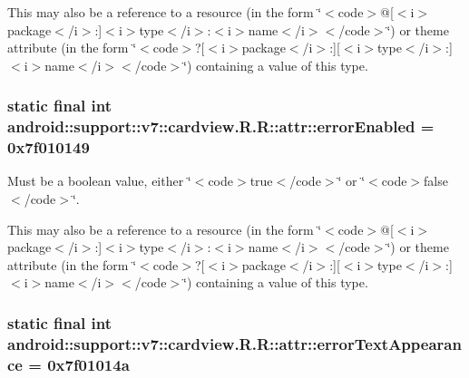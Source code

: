 This may also be a reference to a resource (in the form \char`\"{}$<$code$>$@\mbox{[}$<$i$>$package$<$/i$>$:\mbox{]}$<$i$>$type$<$/i$>$:$<$i$>$name$<$/i$>$$<$/code$>$\char`\"{}) or theme attribute (in the form \char`\"{}$<$code$>$?\mbox{[}$<$i$>$package$<$/i$>$:\mbox{]}\mbox{[}$<$i$>$type$<$/i$>$:\mbox{]}$<$i$>$name$<$/i$>$$<$/code$>$\char`\"{}) containing a value of this type. \hypertarget{classandroid_1_1support_1_1v7_1_1cardview_1_1_r_1_1attr_e59ad5bee61af52504eafa4d6320bfee}{
\subsubsection[{errorEnabled}]{\setlength{\rightskip}{0pt plus 5cm}static final int android::support::v7::cardview.R.R::attr::errorEnabled = 0x7f010149}}
\label{classandroid_1_1support_1_1v7_1_1cardview_1_1_r_1_1attr_e59ad5bee61af52504eafa4d6320bfee}


Must be a boolean value, either \char`\"{}$<$code$>$true$<$/code$>$\char`\"{} or \char`\"{}$<$code$>$false$<$/code$>$\char`\"{}. 

This may also be a reference to a resource (in the form \char`\"{}$<$code$>$@\mbox{[}$<$i$>$package$<$/i$>$:\mbox{]}$<$i$>$type$<$/i$>$:$<$i$>$name$<$/i$>$$<$/code$>$\char`\"{}) or theme attribute (in the form \char`\"{}$<$code$>$?\mbox{[}$<$i$>$package$<$/i$>$:\mbox{]}\mbox{[}$<$i$>$type$<$/i$>$:\mbox{]}$<$i$>$name$<$/i$>$$<$/code$>$\char`\"{}) containing a value of this type. \hypertarget{classandroid_1_1support_1_1v7_1_1cardview_1_1_r_1_1attr_d1bd11dde6ff02691638fba5cf74fb1a}{
\subsubsection[{errorTextAppearance}]{\setlength{\rightskip}{0pt plus 5cm}static final int android::support::v7::cardview.R.R::attr::errorTextAppearance = 0x7f01014a}}
\label{classandroid_1_1support_1_1v7_1_1cardview_1_1_r_1_1attr_d1bd11dde6ff02691638fba5cf74fb1a}


